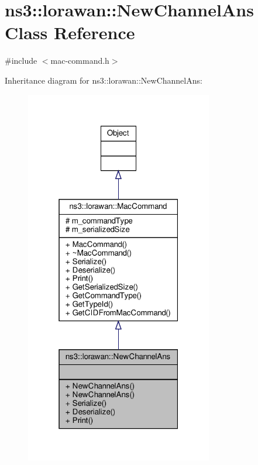 \hypertarget{classns3_1_1lorawan_1_1NewChannelAns}{}\section{ns3\+:\+:lorawan\+:\+:New\+Channel\+Ans Class Reference}
\label{classns3_1_1lorawan_1_1NewChannelAns}


{\ttfamily \#include $<$mac-\/command.\+h$>$}



Inheritance diagram for ns3\+:\+:lorawan\+:\+:New\+Channel\+Ans\+:
\nopagebreak
\begin{figure}[H]
\begin{center}
\leavevmode
\includegraphics[width=232pt]{classns3_1_1lorawan_1_1NewChannelAns__inherit__graph}
\end{center}
\end{figure}


